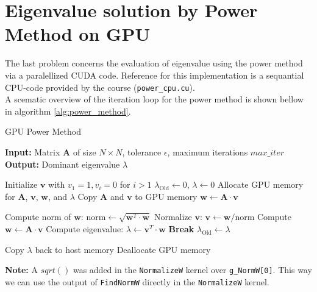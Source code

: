 \section{Eigenvalue solution by Power Method on GPU}
The last problem concerns the evaluation of eigenvalue using the power method via a paralellized CUDA code. Reference for this implementation is a sequantial CPU-code provided by the course (\texttt{power\_cpu.cu}).\\

A scematic overview of the iteration loop for the power method is shown bellow in algorithm \autoref{alg:power_method}. 
\begin{algorithm}
    \caption{GPU Power Method}
    \label{alg:power_method}
    \begin{algorithmic}[1]
    \State \textbf{Input:} Matrix $\mathbf{A}$ of size $N \times N$, tolerance $\epsilon$, maximum iterations $max\_iter$
    \State \textbf{Output:} Dominant eigenvalue $\lambda$
    
    \State Initialize $\mathbf{v}$ with $v_1 = 1, v_i = 0$ for $i > 1$
    \State $\lambda_\text{Old} \gets 0$, $\lambda \gets 0$
    \State Allocate GPU memory for $\mathbf{A}$, $\mathbf{v}$, $\mathbf{w}$, and $\lambda$
    \State Copy $\mathbf{A}$ and $\mathbf{v}$ to GPU memory
    \State $\mathbf{w} \gets \mathbf{A} \cdot \mathbf{v}$ 
    
        \State Compute norm of $\mathbf{w}$: $\text{norm} \gets \sqrt{\mathbf{w}^T \cdot \mathbf{w}}$ 
        \State Normalize $\mathbf{v}$: $\mathbf{v} \gets \mathbf{w} / \text{norm}$ 
        \State Compute $\mathbf{w} \gets \mathbf{A} \cdot \mathbf{v}$ 
        \State Compute eigenvalue: $\lambda \gets \mathbf{v}^T \cdot \mathbf{w}$ 
            \State \textbf{Break} 
        \EndIf
        \State $\lambda_\text{Old} \gets \lambda$
    \EndFor
    
    \State Copy $\lambda$ back to host memory
    \State Deallocate GPU memory
    \end{algorithmic}
\end{algorithm}

\textbf{Note:} A $sqrt()$ was added in the \texttt{NormalizeW} kernel over \texttt{g\_NormW[0]}. This way we can use the output of \texttt{FindNormW} directly in the \texttt{NormalizeW} kernel.\\

